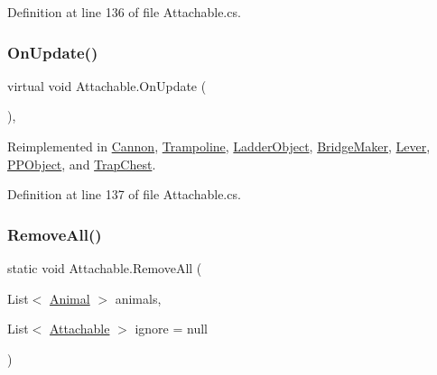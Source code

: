 Definition at line 136 of file Attachable.\+cs.

\mbox{\label{class_attachable_abb659a66efacd6fa09fa1d7125c7b5e6}} 
\subsubsection{\texorpdfstring{On\+Update()}{OnUpdate()}}
{\footnotesize\ttfamily virtual void Attachable.\+On\+Update (\begin{DoxyParamCaption}{ }\end{DoxyParamCaption})\hspace{0.3cm}{\ttfamily [protected]}, {\ttfamily [virtual]}}



Reimplemented in \mbox{\hyperlink{class_cannon_aa5d69c897923c5ac5bdcc16b18f1cf85}{Cannon}}, \mbox{\hyperlink{class_trampoline_acb12701ada778aa924cf51b892abc364}{Trampoline}}, \mbox{\hyperlink{class_ladder_object_a0ea09ce266154cd7be7ddb15c7f31874}{Ladder\+Object}}, \mbox{\hyperlink{class_bridge_maker_a6c7c0e10a22698192076b53c8bc55d07}{Bridge\+Maker}}, \mbox{\hyperlink{class_lever_a951c61f78d4f24b33d4ceb7ac3d53efb}{Lever}}, \mbox{\hyperlink{class_p_p_object_a74855705698504fae01ef77b0cee6313}{P\+P\+Object}}, and \mbox{\hyperlink{class_trap_chest_a8e86df57796079618494f48e727cc782}{Trap\+Chest}}.



Definition at line 137 of file Attachable.\+cs.

\mbox{\label{class_attachable_a63695e26ad1e6e27d3d252451524f18e}} 
\subsubsection{\texorpdfstring{Remove\+All()}{RemoveAll()}\hspace{0.1cm}{\footnotesize\ttfamily [1/3]}}
{\footnotesize\ttfamily static void Attachable.\+Remove\+All (\begin{DoxyParamCaption}\item[{List$<$ \mbox{\hyperlink{class_animal}{Animal}} $>$}]{animals,  }\item[{List$<$ \mbox{\hyperlink{class_attachable}{Attachable}} $>$}]{ignore = {\ttfamily null} }\end{DoxyParamCaption})\hspace{0.3cm}{\ttfamily [static]}}



